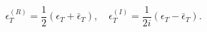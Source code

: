 \begin{equation}\label{23}
\epsilon^{(R)}_T=\frac12(\epsilon_{T}+\bar\epsilon_{T}),\quad
\epsilon^{(I)}_T=\frac{1}{2i}(\epsilon_{T}-\bar\epsilon_{T}). 
\end{equation} 
